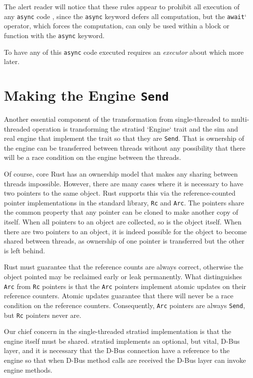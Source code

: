 \documentclass[]{article}
\begin{document}
The alert reader will notice that these rules appear to prohibit all execution of any \texttt{async} code , since the \texttt{async} keyword defers all computation, but the \texttt{await}` operator, which forces the computation, can only be used within a block or function with the \texttt{async} keyword.

To have any of this \texttt{async} code executed requires an \emph{executor} about which more later.

\section{Making the Engine \texttt{Send}}
Another essential component of the transformation from single-threaded to multi-threaded operation is transforming the stratisd `Engine` trait and the sim and real engine that implement the trait so that they are \texttt{Send}. That is
ownership of the engine can be transferred between threads without any possibility that there will be a race condition on the engine between the threads.

Of course, core Rust has an ownership model that makes any sharing between threads impossible. However, there are many cases where it is necessary to have two pointers to the same object. Rust supports this via the reference-counted pointer implementations in the standard library, \texttt{Rc} and \texttt{Arc}. The pointers share the common property that any pointer can be cloned to make another copy of itself. When all pointers to an object are collected, so is the object itself. When there are two pointers to an object, it is indeed possible for the object to become shared between threads, as ownership of one pointer is transferred but the other is left behind.

Rust must guarantee that the reference counts are always correct, otherwise the object pointed may be reclaimed early or leak permanently. What distinguishes \texttt{Arc} from \texttt{Rc} pointers is that the \texttt{Arc} pointers implement atomic updates on their reference counters. Atomic updates
guarantee that there will never be a race condition on the reference counters. Consequently, \texttt{Arc} pointers are always \texttt{Send}, but \texttt{Rc} pointers never are.

Our chief concern in the single-threaded stratisd implementation is that the engine itself must be shared. stratisd implements an optional, but vital, D-Bus layer, and it is necessary that the D-Bus connection have a reference to the engine so that when D-Bus method calls are received the D-Bus layer can invoke engine methods.
\end{document}
